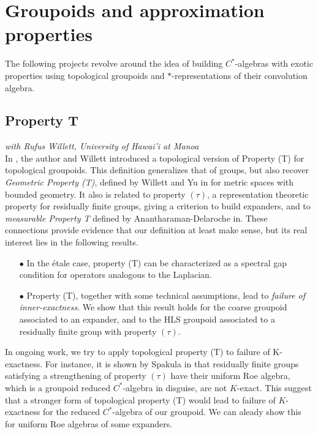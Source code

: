 \section{Groupoids and approximation properties}

The following projects revolve around the idea of building $C^*$-algebras with exotic properties using topological groupoids and $*$-representations of their convolution algebra.

\subsection*{Property T}

\textit{with Rufus Willett, University of Hawai'i at Manoa}\\

In \cite{DellWillett}, the author and Willett introduced a topological version of Property (T) for topological groupoids. This definition generalizes that of groups, but also recover \textit{Geometric Property (T)}, defined by Willett and Yu in \cite{WillettYu} for metric spaces with bounded geometry. It also is related to property $( \tau )$, a representation theoretic property for residually finite groups, giving a criterion to build expanders, and to \textit{measurable Property T} defined by Anantharaman-Delaroche in\cite{anantharamanT}. These connections provide evidence that our definition at least make sense, but its real interest lies in the following results.
\begin{itemize}
\item[$\bullet$] In the \'etale case, property (T) can be characterized as a spectral gap condition for operators analogous to the Laplacian. 
\item[$\bullet$] Property (T), together with some technical assumptions, lead to \textit{failure of inner-exactness}. We show that this result holds for the coarse groupoid associated to an expander, and to the HLS groupoid associated to a residually finite group with property $(\tau )$. 
\end{itemize}
In ongoing work, we try to apply topological property (T) to failure of K-exactness. For instance, it is shown by Spakula in \cite{SpakulaBoxSpace} that residually finite groups satisfying a strengthening of property $(\tau)$ have their uniform Roe algebra, which is a groupoid reduced $C^*$-algebra in disguise, are not $K$-exact. This suggest that a stronger form of topological property (T) would lead to failure of $K$-exactness for the reduced $C^*$-algebra of our groupoid. We can aleady show this for uniform Roe algebras of some expanders. 

